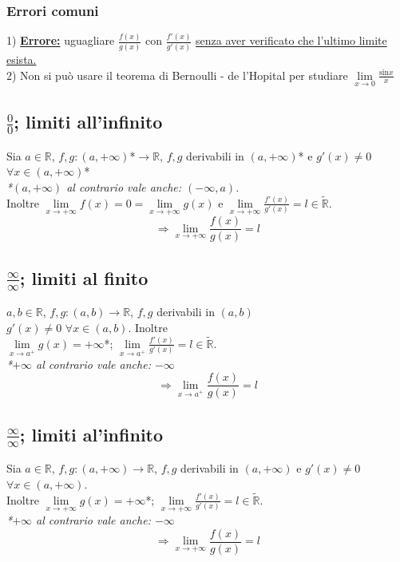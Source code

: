 \documentclass{article}
\newcommand{\R}{\mathbb{R}}
\newcommand{\Rext}{\widetilde{\mathbb{R}}}
\begin{document}
\begin{flushleft}
\subsubsection{Errori comuni}
1) \underline{\textbf{Errore:}} uguagliare $\frac{f(x)}{g(x)}$ con $\frac{f'(x)}{g'(x)}$ \underline{senza aver verificato che l'ultimo limite esista.}\\
2) Non si può usare il teorema di Bernoulli - de l'Hopital per studiare $\lim\limits_{x \to 0}\frac{\text{sin}x}{x}$

\subsection{$\frac{0}{0}$; limiti all'infinito}
Sia $a \in \R$, $f,g: (a, + \infty)$*$ \rightarrow \R$, $f, g$ derivabili in $(a, + \infty)$* e $g'(x) \neq 0$ $\forall x \in (a, + \infty)$*\\
\textit{*$(a, +\infty)$ al contrario vale anche: $(- \infty, a)$.}\\
Inoltre $\lim\limits_{x \to + \infty}f(x) = 0 = \lim\limits_{x \to + \infty}g(x)$ e $\lim\limits_{x \to +\infty}\frac{f'(x)}{g'(x)} =l \in \Rext$.\\
\[ \Rightarrow \lim\limits_{x \to +\infty}\frac{f(x)}{g(x)} = l\]

\subsection{$\frac{\infty}{\infty}$; limiti al finito}
$a, b \in \R$, $f, g:(a,b) \rightarrow \R$, $f,g $ derivabili in $(a,b)$\\
$g'(x) \neq 0$ $\forall x \in (a,b)$. Inoltre\\
$\lim\limits_{x \to a^+}g(x) = +\infty$*; $\lim\limits_{x \to a^+}\frac{f'(x)}{g'(x)} = l \in \Rext$.\\
\textit{*$+\infty$ al contrario vale anche: $-\infty$}\\
\[ \Rightarrow \lim\limits_{x \to a^+}\frac{f(x)}{g(x)} = l\]

\subsection{$\frac{\infty}{\infty}$; limiti al'infinito}
Sia $a \in \R$, $f,g: (a, + \infty) \rightarrow \R$, $f, g$ derivabili in $(a, + \infty)$ e $g'(x) \neq 0$ $\forall x \in (a, + \infty)$.\\
Inoltre $\lim\limits_{x \to + \infty}g(x) = +\infty$*; $\lim\limits_{x \to +\infty}\frac{f'(x)}{g'(x)} = l \in \Rext$.\\
\textit{*$+\infty$ al contrario vale anche: $-\infty$}\\
\[ \Rightarrow \lim\limits_{x \to +\infty}\frac{f(x)}{g(x)} = l\]


\end{flushleft}
\end{document}
